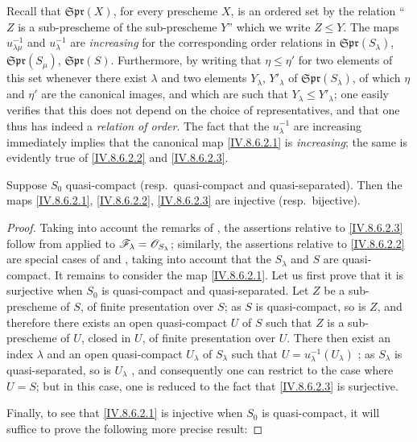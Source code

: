 
Recall  that $\mathfrak{Spr}(X)$, for every prescheme $X$, is an ordered set by the relation ``$Z$ is a sub-prescheme of the sub-prescheme $Y$'' which we write $Z\leqslant Y$.
The maps $u_{\lambda\mu}^{-1}$ and $u_\lambda^{-1}$ are \emph{increasing} for the corresponding order relations in $\mathfrak{Spr}(S_\lambda)$, $\mathfrak{Spr}(S_\mu)$, $\mathfrak{Spr}(S)$.
Furthermore, by writing that $\eta\leqslant\eta'$ for two elements of this set whenever there exist $\lambda$ and two elements $Y_\lambda$, $Y'_\lambda$ of $\mathfrak{Spr}(S_\lambda)$, of which $\eta$ and $\eta'$ are the canonical images, and which are such that $Y_\lambda\leqslant Y'_\lambda$; one easily verifies that this does not depend on the choice of representatives, and that one thus has indeed a \emph{relation of order}.
The fact that the $u_\lambda^{-1}$ are increasing immediately implies that the canonical map \eqref{IV.8.6.2.1} is \emph{increasing}; the same is evidently true of \eqref{IV.8.6.2.2} and \eqref{IV.8.6.2.3}.

\begin{proposition}[8.6.3]
\label{IV.8.6.3}
Suppose $S_0$ quasi-compact (resp.\ quasi-compact and quasi-separated).
Then the maps \eqref{IV.8.6.2.1}, \eqref{IV.8.6.2.2}, \eqref{IV.8.6.2.3} are injective (resp.\ bijective).
\end{proposition}

\begin{proof}
Taking into account the remarks of , the assertions relative to \eqref{IV.8.6.2.3} follow from  applied to $\mathscr{F}_\lambda=\mathscr{O}_{S_\lambda}$; similarly, the assertions relative to \eqref{IV.8.6.2.2} are special cases of  and , taking into account that the $S_\lambda$ and $S$ are quasi-compact.
It remains to consider the map \eqref{IV.8.6.2.1}.
Let us first prove that it is surjective when $S_0$ is quasi-compact and quasi-separated.
Let $Z$ be a sub-prescheme of $S$, of finite presentation over $S$; as $S$ is quasi-compact, so is $Z$, and therefore there exists an open quasi-compact $U$ of $S$ such that $Z$ is a sub-prescheme of $U$, closed in $U$, of finite presentation over $U$.
There then exist an index $\lambda$ and an open quasi-compact $U_\lambda$ of $S_\lambda$ such that $U=u_\lambda^{-1}(U_\lambda)$ ; as $S_\lambda$ is quasi-separated, so is $U_\lambda$ , and consequently one can restrict to the case where $U=S$; but in this case, one is reduced to the fact that \eqref{IV.8.6.2.3} is surjective.

Finally, to see that \eqref{IV.8.6.2.1} is injective when $S_0$ is quasi-compact, it will suffice to prove the following more precise result:
\end{proof}

